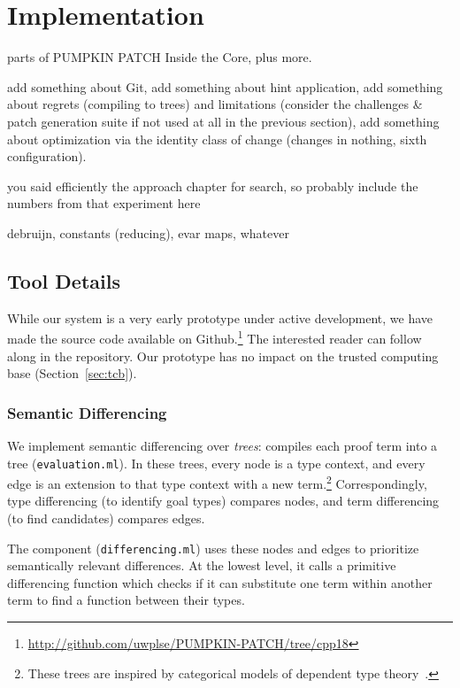 \section{Implementation}
\label{sec:pumpkin-impl}

parts of PUMPKIN PATCH Inside the Core, plus more.

add something about Git, add something about hint application, add something about regrets (compiling to trees) and 
limitations (consider the challenges \& patch generation suite if not used at all in the previous section),
add something about optimization via the identity class of change (changes in nothing, sixth configuration).

you said efficiently the approach chapter for search, so probably include the numbers from that experiment here

debruijn, constants (reducing), evar maps, whatever

\subsection{Tool Details}


While our system is a very early prototype under active development, we have made the source code available on Github.\footnote{\url{http://github.com/uwplse/PUMPKIN-PATCH/tree/cpp18}}
The interested reader can follow along in the repository. %
Our prototype has no impact on the trusted computing base (Section~\ref{sec:tcb}).

\subsubsection{Semantic Differencing} 
\label{sec:pumpkin-impl-diff}

We implement semantic differencing over \emph{trees}:
\sysname compiles each proof term into a tree (\lstinline{evaluation.ml}). In these trees,
every node is a type context, and every edge is an extension to that type context with a 
new term.\footnote{These trees are inspired by categorical models of dependent type theory~\cite{Hofmann97}.}
Correspondingly, type differencing (to identify goal types) compares nodes, 
and term differencing (to find candidates) compares edges. 

The component (\lstinline{differencing.ml}) uses these nodes and edges to prioritize semantically
relevant differences. At the lowest level, it calls a primitive differencing function 
which checks if it can substitute one term within another term to find a function between their types.

